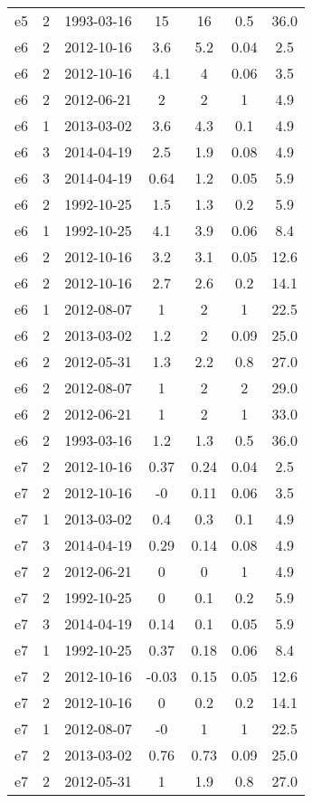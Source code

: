 \begin{table*}[htp]
\begin{tabular}{ccccccc}
e5 & 2 & 1993-03-16 & 15 & 16 & 0.5 & 36.0 \\
e6 & 2 & 2012-10-16 & 3.6 & 5.2 & 0.04 & 2.5 \\
e6 & 2 & 2012-10-16 & 4.1 & 4 & 0.06 & 3.5 \\
e6 & 2 & 2012-06-21 & 2 & 2 & 1 & 4.9 \\
e6 & 1 & 2013-03-02 & 3.6 & 4.3 & 0.1 & 4.9 \\
e6 & 3 & 2014-04-19 & 2.5 & 1.9 & 0.08 & 4.9 \\
e6 & 3 & 2014-04-19 & 0.64 & 1.2 & 0.05 & 5.9 \\
e6 & 2 & 1992-10-25 & 1.5 & 1.3 & 0.2 & 5.9 \\
e6 & 1 & 1992-10-25 & 4.1 & 3.9 & 0.06 & 8.4 \\
e6 & 2 & 2012-10-16 & 3.2 & 3.1 & 0.05 & 12.6 \\
e6 & 2 & 2012-10-16 & 2.7 & 2.6 & 0.2 & 14.1 \\
e6 & 1 & 2012-08-07 & 1 & 2 & 1 & 22.5 \\
e6 & 2 & 2013-03-02 & 1.2 & 2 & 0.09 & 25.0 \\
e6 & 2 & 2012-05-31 & 1.3 & 2.2 & 0.8 & 27.0 \\
e6 & 2 & 2012-08-07 & 1 & 2 & 2 & 29.0 \\
e6 & 2 & 2012-06-21 & 1 & 2 & 1 & 33.0 \\
e6 & 2 & 1993-03-16 & 1.2 & 1.3 & 0.5 & 36.0 \\
e7 & 2 & 2012-10-16 & 0.37 & 0.24 & 0.04 & 2.5 \\
e7 & 2 & 2012-10-16 & -0 & 0.11 & 0.06 & 3.5 \\
e7 & 1 & 2013-03-02 & 0.4 & 0.3 & 0.1 & 4.9 \\
e7 & 3 & 2014-04-19 & 0.29 & 0.14 & 0.08 & 4.9 \\
e7 & 2 & 2012-06-21 & 0 & 0 & 1 & 4.9 \\
e7 & 2 & 1992-10-25 & 0 & 0.1 & 0.2 & 5.9 \\
e7 & 3 & 2014-04-19 & 0.14 & 0.1 & 0.05 & 5.9 \\
e7 & 1 & 1992-10-25 & 0.37 & 0.18 & 0.06 & 8.4 \\
e7 & 2 & 2012-10-16 & -0.03 & 0.15 & 0.05 & 12.6 \\
e7 & 2 & 2012-10-16 & 0 & 0.2 & 0.2 & 14.1 \\
e7 & 1 & 2012-08-07 & -0 & 1 & 1 & 22.5 \\
e7 & 2 & 2013-03-02 & 0.76 & 0.73 & 0.09 & 25.0 \\
e7 & 2 & 2012-05-31 & 1 & 1.9 & 0.8 & 27.0 \\

\end{tabular}
\end{table*}
